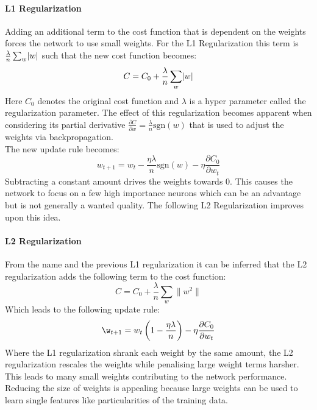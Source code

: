 				\paragraph{L1 Regularization}
					Adding an additional term to the cost function that is dependent on the weights forces the network to use small weights. For the L1 Regularization this term is $\frac{\lambda}{n} \sum_{w}^{\,} \lvert w\rvert$ such that the new cost function becomes:
					\begin{equation}
						C = C_0 + \frac{\lambda}{n} \sum_{w}^{\,} \lvert w\rvert
					\end{equation}
					Here $C_0$ denotes the original cost function and $\lambda$ is a hyper parameter called the regularization parameter. The effect of this regularization becomes apparent when considering its partial derivative $\frac{\partial C}{\partial w} = \frac{\lambda}{n} \mathrm{sgn}(w)$ that is used to adjust the weights via backpropagation.\\
					The new update rule becomes:
					\begin{equation}
						w_{t+1} = w_t  - \frac{\eta \lambda}{n}\mathrm{sgn}(w) - \eta \frac{\partial C_0}{\partial w_t}
					\end{equation}
					Subtracting a constant amount drives the weights towards 0. This causes the network to focus on a few high importance neurons which can be an advantage but is not generally a wanted quality. The following L2 Regularization improves upon this idea.
				\paragraph{L2 Regularization}
					From the name and the previous L1 regularization it can be inferred that the L2 regularization adds the following term to the cost function:
					\begin{equation}
						C = C_0 + \frac{\lambda}{n} \sum_{w}^{\,} \| w^2 \|
					\end{equation}
					Which leads to the following update rule:
					\begin{equation}
						\w_{t+1} = w_t \left( 1 - \frac{\eta \lambda}{n}\right) - \eta \frac{\partial C_0}{\partial w_t}
					\end{equation}
					Where the L1 regularization shrank each weight by the same amount, the L2 regularization rescales the weights while penalising large weight terms harsher. This leads to many small weights contributing to the network performance. Reducing the size of weights is appealing because large weights can be used to learn single features like particularities of the training data. 
